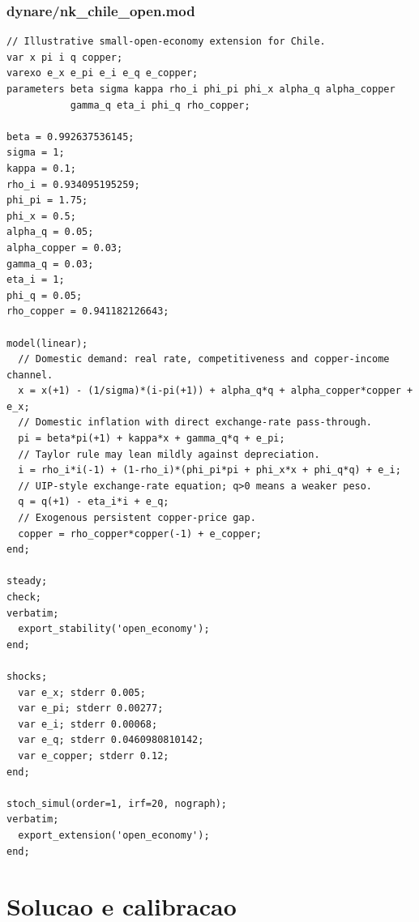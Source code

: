 \documentclass[9pt]{extarticle}
\begin{document}
\section{dynare/nk\_chile\_open.mod}
\begin{lstlisting}[language={}]
// Illustrative small-open-economy extension for Chile.
var x pi i q copper;
varexo e_x e_pi e_i e_q e_copper;
parameters beta sigma kappa rho_i phi_pi phi_x alpha_q alpha_copper
           gamma_q eta_i phi_q rho_copper;

beta = 0.992637536145;
sigma = 1;
kappa = 0.1;
rho_i = 0.934095195259;
phi_pi = 1.75;
phi_x = 0.5;
alpha_q = 0.05;
alpha_copper = 0.03;
gamma_q = 0.03;
eta_i = 1;
phi_q = 0.05;
rho_copper = 0.941182126643;

model(linear);
  // Domestic demand: real rate, competitiveness and copper-income channel.
  x = x(+1) - (1/sigma)*(i-pi(+1)) + alpha_q*q + alpha_copper*copper + e_x;
  // Domestic inflation with direct exchange-rate pass-through.
  pi = beta*pi(+1) + kappa*x + gamma_q*q + e_pi;
  // Taylor rule may lean mildly against depreciation.
  i = rho_i*i(-1) + (1-rho_i)*(phi_pi*pi + phi_x*x + phi_q*q) + e_i;
  // UIP-style exchange-rate equation; q>0 means a weaker peso.
  q = q(+1) - eta_i*i + e_q;
  // Exogenous persistent copper-price gap.
  copper = rho_copper*copper(-1) + e_copper;
end;

steady;
check;
verbatim;
  export_stability('open_economy');
end;

shocks;
  var e_x; stderr 0.005;
  var e_pi; stderr 0.00277;
  var e_i; stderr 0.00068;
  var e_q; stderr 0.0460980810142;
  var e_copper; stderr 0.12;
end;

stoch_simul(order=1, irf=20, nograph);
verbatim;
  export_extension('open_economy');
end;
\end{lstlisting}
\clearpage
\part*{Solucao e calibracao}
\end{document}
